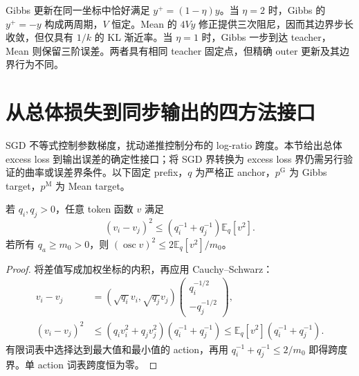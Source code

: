 \documentclass[lang=cn,scheme=chinese,openany]{../book/elegantbook}
\newcommand{\E}{\mathbb E}
\begin{document}
Gibbs 更新在同一坐标中恰好满足 $y^+=(1-\eta)y$。当 $\eta=2$ 时，Gibbs 的 $y^+=-y$ 构成两周期，$V$ 恒定。Mean 的 $4Vy$ 修正提供三次阻尼，因而其边界步长收敛，但仅具有 $1/k$ 的 KL 渐近率。当 $\eta=1$ 时，Gibbs 一步到达 teacher，Mean 则保留三阶误差。两者具有相同 teacher 固定点，但精确 outer 更新及其边界行为不同。



\section{从总体损失到同步输出的四方法接口}
\label{dyn:bridges}

SGD 不等式控制参数梯度，扰动递推控制分布的 log-ratio 跨度。本节给出总体 excess loss 到输出误差的确定性接口；将 SGD 界转换为 excess loss 界仍需另行验证的曲率或误差界条件。以下固定 prefix，$q$ 为严格正 anchor，$p^{\mathrm G}$ 为 Gibbs target，$p^{\mathrm M}$ 为 Mean target。

\begin{lemma}[加权平方控制动作间的差值]
\label{dyn:contrast}
若 $q_i,q_j>0$，任意 token 函数 $v$ 满足
\begin{equation}
(v_i-v_j)^2\le(q_i^{-1}+q_j^{-1})\E_q[v^2].
\end{equation}
若所有 $q_a\ge m_0>0$，则 $(\operatorname{osc}v)^2\le2\E_q[v^2]/m_0$。
\end{lemma}
\begin{proof}
将差值写成加权坐标的内积，再应用 Cauchy--Schwarz：
\begin{align*}
v_i-v_j&=(\sqrt{q_i}v_i,\sqrt{q_j}v_j)
\begin{pmatrix}q_i^{-1/2}\\-q_j^{-1/2}\end{pmatrix},\\
(v_i-v_j)^2&\le(q_iv_i^2+q_jv_j^2)(q_i^{-1}+q_j^{-1})
\le\E_q[v^2](q_i^{-1}+q_j^{-1}).
\end{align*}
有限词表中选择达到最大值和最小值的 action，再用 $q_i^{-1}+q_j^{-1}\le2/m_0$ 即得跨度界。单 action 词表跨度恒为零。
\end{proof}
\end{document}

